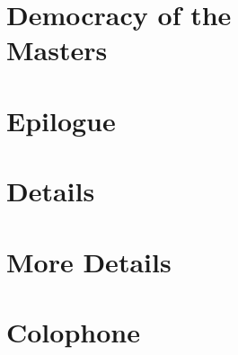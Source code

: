 \documentclass[11pt]{book}
\begin{document}
\chapter[Democracy of the Masters]{Democracy of the\\Masters}
\lipsum[1-10]

\chapter{Epilogue}
\blindmathpaper

\appendix

\chapter{Details}
\lipsum[2-5]

\chapter{More Details}
\lipsum[4-9]

\backmatter

\newpage
{}
{}
{}

%
%
%

\chapter*{Colophone}
\lipsum[2]

\clearpage
{}
\printindex
\end{document}

